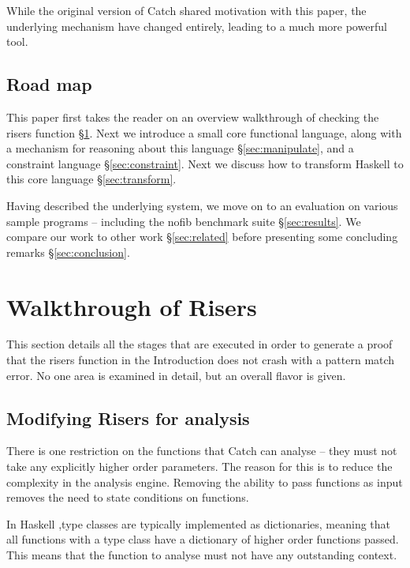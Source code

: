 \documentclass[preprint]{sigplanconf}
\newcommand{\C}[1]{\textsf{#1}}
\begin{document}
While the original version of Catch shared motivation with this paper, the underlying mechanism have changed entirely, leading to a much more powerful tool.

\subsection{Road map}

This paper first takes the reader on an overview walkthrough of checking the \C{risers} function \S\ref{sec:walkthrough}. Next we introduce a small core functional language, along with a mechanism for reasoning about this language \S\ref{sec:manipulate}, and a constraint language \S\ref{sec:constraint}. Next we discuss how to transform Haskell to this core language \S\ref{sec:transform}.

Having described the underlying system, we move on to an evaluation on various sample programs -- including the \textsf{nofib} benchmark suite \S\ref{sec:results}. We compare our work to other work \S\ref{sec:related} before presenting some concluding remarks \S\ref{sec:conclusion}.

\section{Walkthrough of Risers}
\label{sec:walkthrough}

This section details all the stages that are executed in order to generate a proof that the \C{risers} function in the Introduction does not crash with a pattern match error. No one area is examined in detail, but an overall flavor is given.

\subsection{Modifying Risers for analysis}

There is one restriction on the functions that Catch can analyse -- they must not take any explicitly higher order parameters. The reason for this is to reduce the complexity in the analysis engine. Removing the ability to pass functions as input removes the need to state conditions on functions.

In Haskell \citep{haskell},type classes are typically implemented \citep{type_classes} as dictionaries, meaning that all functions with a type class have a dictionary of higher order functions passed. This means that the function to analyse must not have any outstanding context.
\end{document}
